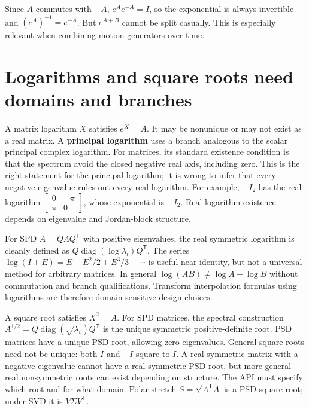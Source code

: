 Since \(A\) commutes with \(-A\), \(e^Ae^{-A}=I\), so the exponential is always invertible and \((e^A)^{-1}=e^{-A}\). But \(e^{A+B}\) cannot be split casually. This is especially relevant when combining motion generators over time.

\section{Logarithms and square roots need domains and branches}\label{02-foundations-ii-ch026-logarithms-and-square-roots-need-domains-and-branches}

\hypertarget{02-foundations-ii-ch026-logarithms-and-square-roots-need-domains-and-branches}{}

A matrix logarithm \(X\) satisfies \(e^X=A\). It may be nonunique or may not exist as a real matrix. A \textbf{principal logarithm} uses a branch analogous to the scalar principal complex logarithm. For matrices, its standard existence condition is that the spectrum avoid the closed negative real axis, including zero. This is the right statement for the principal logarithm; it is wrong to infer that every negative eigenvalue rules out every real logarithm. For example, \(-I_2\) has the real logarithm \(\begin{bmatrix}0&-\pi\\\pi&0\end{bmatrix}\), whose exponential is \(-I_2\). Real logarithm existence depends on eigenvalue and Jordan-block structure.

For SPD \(A=Q\Lambda Q^\mathsf T\) with positive eigenvalues, the real symmetric logarithm is cleanly defined as \(Q\operatorname{diag}(\log\lambda_i)Q^\mathsf T\). The series \(\log(I+E)=E-E^2/2+E^3/3-\cdots\) is useful near identity, but not a universal method for arbitrary matrices. In general \(\log(AB)\ne\log A+\log B\) without commutation and branch qualifications. Transform interpolation formulas using logarithms are therefore domain-sensitive design choices.

A square root satisfies \(X^2=A\). For SPD matrices, the spectral construction \(A^{1/2}=Q\operatorname{diag}(\sqrt{\lambda_i})Q^\mathsf T\) is the unique symmetric positive-definite root. PSD matrices have a unique PSD root, allowing zero eigenvalues. General square roots need not be unique: both \(I\) and \(-I\) square to \(I\). A real symmetric matrix with a negative eigenvalue cannot have a real symmetric PSD root, but more general real nonsymmetric roots can exist depending on structure. The API must specify which root and for what domain. Polar stretch \(S=\sqrt{A^\mathsf TA}\) is a PSD square root; under SVD it is \(V\Sigma V^\mathsf T\).

